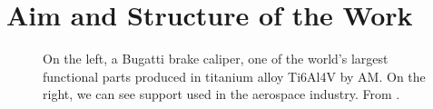 \section{Aim and Structure of the Work}
\label{sec:aimwork}
\begin{figure}
    \centering
    \quad
    \caption[Functional AM part printed in metal.]{On the left, a Bugatti brake caliper, one of the world’s largest functional parts produced in titanium alloy Ti6Al4V by AM. On the right, we can see support used in the aerospace industry. From \citeauthor{du_plessis_beautiful_2019}.}
    \label{fig:funcpart}
\end{figure}
